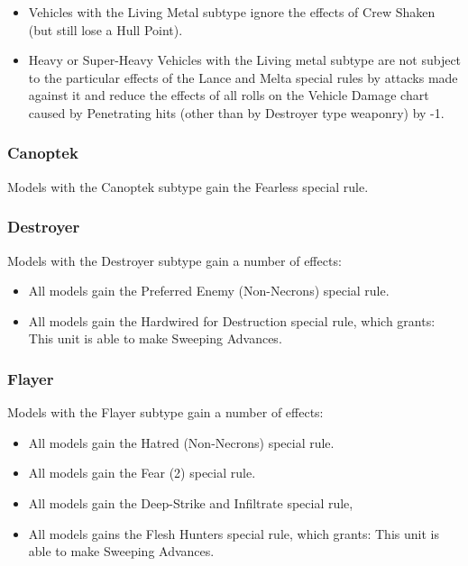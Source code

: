 \begin{itemize}
	\item Vehicles with the Living Metal subtype ignore the effects of Crew Shaken (but still lose a Hull Point).
	\item Heavy or Super-Heavy Vehicles with the Living metal subtype are not subject to the particular effects of the Lance and Melta special rules by attacks made against it and reduce the effects of all rolls on the Vehicle Damage chart caused by Penetrating hits (other than by Destroyer type weaponry) by -1.
\end{itemize} 

\subsubsection{Canoptek} \label{Canoptek}

Models with the Canoptek subtype gain the Fearless special rule. \\

\subsubsection{Destroyer} \label{Destroyer}

Models with the Destroyer subtype gain a number of effects:

\begin{itemize}
	\item All models gain the Preferred Enemy (Non-Necrons) special rule. \\
	\item All models gain the Hardwired for Destruction special rule, which grants: This unit is able to make Sweeping Advances. \\
\end{itemize}

\subsubsection{Flayer} \label{Flayer}

Models with the Flayer subtype gain a number of effects:

\begin{itemize}
	\item All models gain the Hatred (Non-Necrons) special rule. \\
	\item All models gain the Fear (2) special rule. \\
	\item All models gain the Deep-Strike and Infiltrate special rule, \\
	\item All models gains the Flesh Hunters special rule, which grants: This unit is able to make Sweeping Advances. \\
\end{itemize}

